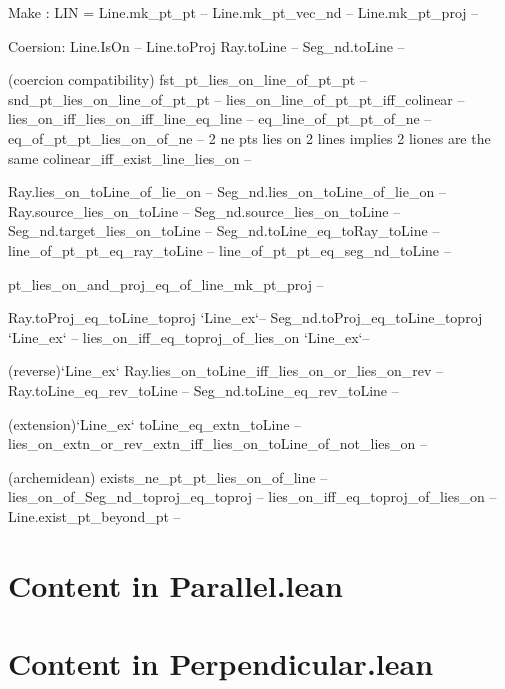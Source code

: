 \documentclass[12pt,a4paper]{article}
\begin{document}
  Make :
    LIN = Line.mk_pt_pt -- 
    Line.mk_pt_vec_nd --
    Line.mk_pt_proj --

  Coersion:
    Line.IsOn --
    Line.toProj
    Ray.toLine  --
    Seg_nd.toLine --

  (coercion compatibility)
    fst_pt_lies_on_line_of_pt_pt --
    snd_pt_lies_on_line_of_pt_pt --
    lies_on_line_of_pt_pt_iff_colinear --
    lies_on_iff_lies_on_iff_line_eq_line --
    eq_line_of_pt_pt_of_ne --
    eq_of_pt_pt_lies_on_of_ne -- 2 ne pts lies on 2 lines implies 2 liones are the same
    colinear_iff_exist_line_lies_on --

    Ray.lies_on_toLine_of_lie_on --
    Seg_nd.lies_on_toLine_of_lie_on --
    Ray.source_lies_on_toLine --
    Seg_nd.source_lies_on_toLine --
    Seg_nd.target_lies_on_toLine --
    Seg_nd.toLine_eq_toRay_toLine --
    line_of_pt_pt_eq_ray_toLine --
    line_of_pt_pt_eq_seg_nd_toLine --

    pt_lies_on_and_proj_eq_of_line_mk_pt_proj --

    Ray.toProj_eq_toLine_toproj `Line_ex`--
    Seg_nd.toProj_eq_toLine_toproj `Line_ex` --
    lies_on_iff_eq_toproj_of_lies_on `Line_ex`--

    (reverse)`Line_ex`
    Ray.lies_on_toLine_iff_lies_on_or_lies_on_rev --
    Ray.toLine_eq_rev_toLine --
    Seg_nd.toLine_eq_rev_toLine --

    (extension)`Line_ex`
    toLine_eq_extn_toLine --
    lies_on_extn_or_rev_extn_iff_lies_on_toLine_of_not_lies_on --

    (archemidean)
    exists_ne_pt_pt_lies_on_of_line --
    lies_on_of_Seg_nd_toproj_eq_toproj --
    lies_on_iff_eq_toproj_of_lies_on --
    Line.exist_pt_beyond_pt --
    

\section{Content in Parallel.lean}



\section{Content in Perpendicular.lean}
\end{document}
